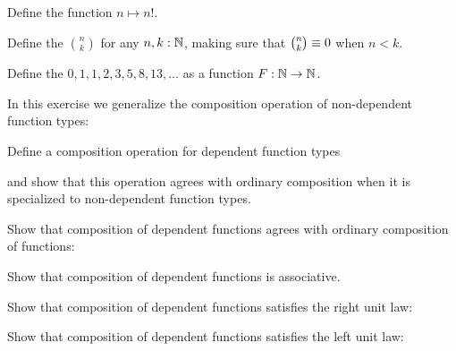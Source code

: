 \begin{exercises}
\begin{subexenum}
  \item Define the  function $n\mapsto n!$.
  \item Define the  $\binom{n}{k}$ for any $n,k:\N$, making sure that $\binom{n}{k}\jdeq 0$ when $n<k$.
  \item Define the  $0,1,1,2,3,5,8,13,\ldots$ as a function $F:\N\to\N$.
  \end{subexenum}
\item In this exercise we generalize the composition operation of non-dependent function types:
\begin{subexenum}
\item Define a composition operation for dependent function types
\begin{prooftree}
\end{prooftree}
and show that this operation agrees with ordinary composition when it is specialized to non-dependent function types.
\item Show that composition of dependent functions agrees with ordinary composition of functions:
  \begin{prooftree}
  \end{prooftree}
\item Show that composition of dependent functions is associative.
\item Show that composition of dependent functions satisfies the right unit law:
\begin{prooftree}
\end{prooftree}
\item Show that composition of dependent functions satisfies the left unit law:
\begin{prooftree}

\end{prooftree}
\end{subexenum}
\end{exercises}
